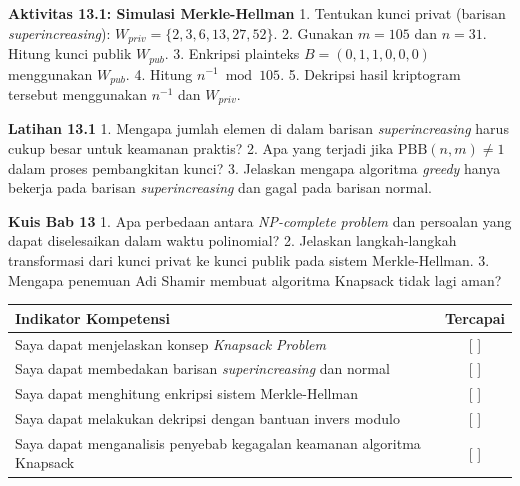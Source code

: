 \documentclass[../main.tex]{subfiles}
\begin{document}
\begin{obeactivity}
\textbf{Aktivitas 13.1: Simulasi Merkle-Hellman}
1. Tentukan kunci privat (barisan \textit{superincreasing}): $W_{priv} = \{2, 3, 6, 13, 27, 52\}$.
2. Gunakan $m = 105$ dan $n = 31$. Hitung kunci publik $W_{pub}$.
3. Enkripsi plainteks $B = (0, 1, 1, 0, 0, 0)$ menggunakan $W_{pub}$.
4. Hitung $n^{-1} \bmod 105$.
5. Dekripsi hasil kriptogram tersebut menggunakan $n^{-1}$ dan $W_{priv}$.
\end{obeactivity}

\begin{obereflection}
\textbf{Latihan 13.1}
1. Mengapa jumlah elemen di dalam barisan \textit{superincreasing} harus cukup besar untuk keamanan praktis?
2. Apa yang terjadi jika $\text{PBB}(n, m) \neq 1$ dalam proses pembangkitan kunci?
3. Jelaskan mengapa algoritma \textit{greedy} hanya bekerja pada barisan \textit{superincreasing} dan gagal pada barisan normal.
\end{obereflection}

\begin{obeassessment}
\textbf{Kuis Bab 13}
1. Apa perbedaan antara \textit{NP-complete problem} dan persoalan yang dapat diselesaikan dalam waktu polinomial?
2. Jelaskan langkah-langkah transformasi dari kunci privat ke kunci publik pada sistem Merkle-Hellman.
3. Mengapa penemuan Adi Shamir membuat algoritma Knapsack tidak lagi aman?
\end{obeassessment}

\begin{competencychecklist}
\begin{tabularx}{\linewidth}{|X|c|}
\hline
Indikator Kompetensi & Tercapai \\
\hline
Saya dapat menjelaskan konsep \textit{Knapsack Problem} & [ ] \\
\hline
Saya dapat membedakan barisan \textit{superincreasing} dan normal & [ ] \\
\hline
Saya dapat menghitung enkripsi sistem Merkle-Hellman & [ ] \\
\hline
Saya dapat melakukan dekripsi dengan bantuan invers modulo & [ ] \\
\hline
Saya dapat menganalisis penyebab kegagalan keamanan algoritma Knapsack & [ ] \\
\hline
\end{tabularx}
\end{competencychecklist}
\end{document}
